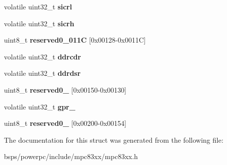 \begin{DoxyCompactItemize}
volatile uint32\+\_\+t {\bfseries sicrl}
\item 
\mbox{\label{structm83xxSysConRegisters___ad9a229bd8622d4b691e899b5cfde5246}} 
volatile uint32\+\_\+t {\bfseries sicrh}
\item 
\mbox{\label{structm83xxSysConRegisters___a162afc2e4050ec42af3970f62cfc6a9e}} 
uint8\+\_\+t {\bfseries reserved0\+\_\+011C} \mbox{[}0x00128-\/0x0011\+C\mbox{]}
\item 
\mbox{\label{structm83xxSysConRegisters___aec55382c185754910cd493f27f104320}} 
volatile uint32\+\_\+t {\bfseries ddrcdr}
\item 
\mbox{\label{structm83xxSysConRegisters___a964e14c0719ed54b37b6fa0aa09abb3a}} 
volatile uint32\+\_\+t {\bfseries ddrdsr}
\item 
\mbox{\label{structm83xxSysConRegisters___aa6f3f2ae58cd8a026aa4eff4051d447f}} 
uint8\+\_\+t {\bfseries reserved0\+\_} \mbox{[}0x00150-\/0x00130\mbox{]}
\item 
\mbox{\label{structm83xxSysConRegisters___ad431c2ed2fafc352c59df15d4247cbae}} 
volatile uint32\+\_\+t {\bfseries gpr\+\_}
\item 
\mbox{\label{structm83xxSysConRegisters___a6e7e62109606bcd5cca908774edc4bfe}} 
uint8\+\_\+t {\bfseries reserved0\+\_} \mbox{[}0x00200-\/0x00154\mbox{]}
\end{DoxyCompactItemize}


The documentation for this struct was generated from the following file\+:\begin{DoxyCompactItemize}
\item 
bsps/powerpc/include/mpc83xx/mpc83xx.\+h\end{DoxyCompactItemize}
